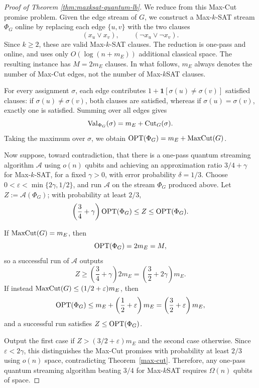 \begin{proof}[Proof of Theorem \ref{thm:maxksat-quantum-lb}]
We reduce from this Max-Cut promise problem. Given the edge stream of $G$, we construct a Max-$k$-SAT stream $\Phi_G$ online by replacing each edge $\{u,v\}$ with the two clauses
\[
  (x_u\vee x_v),
  \qquad
  (\neg x_u\vee \neg x_v).
\]
Since $k\ge2$, these are valid Max-$k$-SAT clauses.  The reduction is one-pass and online, and uses only $O(\log (n+m_E))$ additional classical space. The resulting instance has $M=2m_E$ clauses.  In what follows, $m_E$ always denotes the number of Max-Cut edges, not the number of Max-$k$SAT clauses.

For every assignment $\sigma$, each edge contributes
$1+\mathbf 1[\sigma(u)\ne\sigma(v)]$ satisfied clauses: if $\sigma(u)\ne\sigma(v)$, both clauses are satisfied, whereas if $\sigma(u)=\sigma(v)$, exactly one is satisfied.  Summing over all edges gives
\[
  \operatorname{Val}_{\Phi_G}(\sigma)=m_E+\operatorname{Cut}_G(\sigma).
\]
Taking the maximum over $\sigma$, we obtain
$\operatorname{OPT}(\Phi_G)=m_E+\operatorname{MaxCut}(G)$.

Now suppose, toward contradiction, that there is a one-pass quantum streaming algorithm $\mathcal A$ using $o(n)$ qubits and achieving an approximation ratio
$3/4+\gamma$ for Max-$k$-SAT, for a fixed $\gamma>0$, with error probability $\delta=1/3$. Choose $0<\varepsilon<\min\{2\gamma,1/2\}$, and run $\mathcal A$ on the stream $\Phi_G$ produced above. Let $Z:=\mathcal A(\Phi_G)$; with probability at least $2/3$,
\[
  \left(\frac34+\gamma\right)\operatorname{OPT}(\Phi_G)\le Z\le\operatorname{OPT}(\Phi_G).
\]

If $\operatorname{MaxCut}(G)=m_E$, then
\[
  \operatorname{OPT}(\Phi_G)=2m_E=M,
\]
so a successful run of $\mathcal A$ outputs
\[
  Z\ge
  \left(\frac34+\gamma\right)2m_E
  =
  \left(\frac32+2\gamma\right)m_E.
\]
If instead $\operatorname{MaxCut}(G)\le (1/2+\varepsilon)m_E$, then
\[
  \operatorname{OPT}(\Phi_G)
  \le
  m_E+\left(\frac12+\varepsilon\right)m_E
  =
  \left(\frac32+\varepsilon\right)m_E,
\]
and a successful run satisfies $Z\le\operatorname{OPT}(\Phi_G)$.

Output the first case if $Z>(3/2+\varepsilon)m_E$ and the second case otherwise. Since $\varepsilon<2\gamma$, this distinguishes the Max-Cut promises with probability at least $2/3$ using $o(n)$ space, contradicting Theorem~\ref{max-cut}.  Therefore, any one-pass quantum streaming algorithm beating $3/4$ for Max-$k$SAT requires $\Omega(n)$ qubits of space.
\end{proof}





